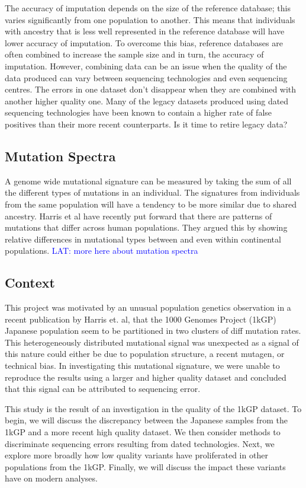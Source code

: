 \documentclass[12pt]{amsart}
\newcommand{\lat}[1]{\textcolor{blue}{LAT: #1}}
\begin{document}
The accuracy of imputation depends on the size of the reference database; this varies significantly from one population to another.
This means that individuals with ancestry that is less well represented in the reference database will have lower accuracy of imputation.
To overcome this bias, reference databases are often combined to increase the sample size and in turn, the accuracy of imputation.
However, combining data can be an issue when the quality of the data produced can vary between sequencing technologies and even sequencing centres.
The errors in one dataset don't disappear when they are combined with another higher quality one. 
Many of the legacy datasets produced using dated sequencing technologies have been known to contain a higher rate of false positives than their more recent counterparts.
Is it time to retire legacy data? 

	\subsection{Mutation Spectra} 
A genome wide mutational signature can be measured by taking the sum of all the different types of mutations in an individual. 
The signatures from individuals from the same population will have a tendency to be more similar due to shared ancestry.
Harris et al have recently put forward that there are patterns of mutations that differ across human populations.
They argued this by showing relative differences in mutational types between and even within continental populations.
\lat{more here about mutation spectra}

	\subsection{Context}
This project was motivated by an unusual population genetics observation in a recent publication by Harris et. al, that the 1000 Genomes Project (1kGP) Japanese population seem to be partitioned in two clusters of diff mutation rates. 
This heterogeneously distributed mutational signal was unexpected as a signal of this nature could either be due to population structure, a recent mutagen, or technical bias.
In investigating this mutational signature, we were unable to reproduce the results using a larger and higher quality dataset and concluded that this signal can be attributed to sequencing error.


This study is the result of an investigation in the quality of the 1kGP dataset.
To begin, we will discuss the discrepancy between the Japanese samples from the 1kGP and a more recent high quality dataset. 
We then consider methods to discriminate sequencing errors resulting from dated technologies.
Next, we explore more broadly how low quality variants have proliferated in other populations from the 1kGP.
Finally, we will discuss the impact these variants have on modern analyses.
\end{document}
